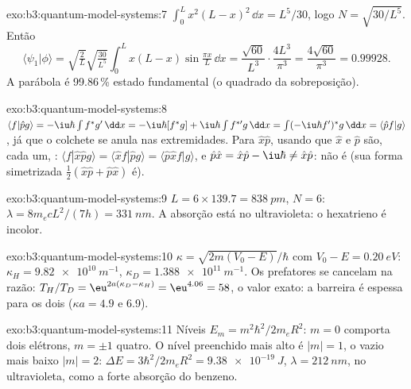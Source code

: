 \begin{solution}{exo:b3:quantum-model-systems:7}
$\int_0^Lx^2(L - x)^2\,\dd x = L^5/30$, logo $N = \sqrt{30/L^5}$. Então
\[
\langle\psi_1|\phi\rangle = \sqrt{\tfrac2L}\sqrt{\tfrac{30}{L^5}}\int_0^Lx(L -
x)\sin\tfrac{\pi x}{L}\,\dd x = \frac{\sqrt{60}}{L^3}\cdot\frac{4L^3}{\pi^3} =
\frac{4\sqrt{60}}{\pi^3} = 0.99928 .
\]
A parábola é 99.86\,\% estado fundamental (o quadrado da sobreposição).
\end{solution}

\begin{solution}{exo:b3:quantum-model-systems:8}
$\langle f|\hat pg\rangle = -\iu\hbar\int f^*g'\,\dd x = -\iu\hbar[f^*g] +
\iu\hbar\int f^{*\prime}g\,\dd x = \int(-\iu\hbar f')^*g\,\dd x = \langle\hat
pf|g\rangle$, já que o colchete se anula nas extremidades. Para $\hat x\hat p$, usando que $\hat x$ e $\hat p$ são, cada um, :
$\langle f|\hat x\hat pg\rangle = \langle\hat xf|\hat pg\rangle = \langle\hat p\hat
xf|g\rangle$, e $\hat p\hat x = \hat x\hat p - \iu\hbar \ne \hat x\hat p$: não é
 (sua forma simetrizada $\frac12(\hat x\hat p + \hat p\hat x)$ é).
\end{solution}

\begin{solution}{exo:b3:quantum-model-systems:9}
$L = 6 \times 139.7 = \qty{838}{pm}$, $N = 6$: $\lambda = 8m_ecL^2/(7h) =
\qty{331}{nm}$. A absorção está no ultravioleta: o hexatrieno é
incolor.
\end{solution}

\begin{solution}{exo:b3:quantum-model-systems:10}
$\kappa = \sqrt{2m(V_0 - E)}/\hbar$ com $V_0 - E = \qty{0.20}{eV}$:
$\kappa_H = \qty{9.82e10}{m^{-1}}$, $\kappa_D = \qty{1.388e11}{m^{-1}}$. Os
prefatores se cancelam na razão: $T_H/T_D = \eu^{2a(\kappa_D - \kappa_H)} =
\eu^{4.06} = 58$, o valor exato: a barreira é espessa para os dois
($\kappa a = 4.9$ e 6.9).
\end{solution}

\begin{solution}{exo:b3:quantum-model-systems:11}
Níveis $E_m = m^2\hbar^2/2m_eR^2$: $m = 0$ comporta dois elétrons, $m = \pm1$
quatro. O nível preenchido mais alto é $|m| = 1$, o vazio mais baixo $|m| = 2$: $\Delta E =
3\hbar^2/2m_eR^2 = \qty{9.38e-19}{J}$, $\lambda = \qty{212}{nm}$, no
ultravioleta, como a forte absorção do benzeno.
\end{solution}

